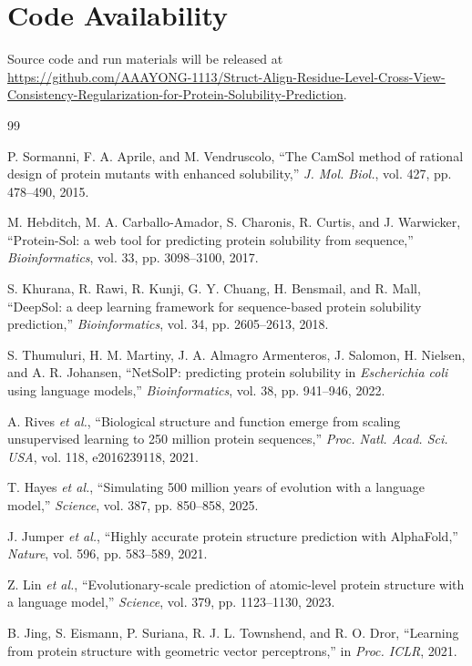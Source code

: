 \documentclass[conference]{IEEEtran}
\begin{document}
\section*{Code Availability}
Source code and run materials will be released at \url{https://github.com/AAAYONG-1113/Struct-Align-Residue-Level-Cross-View-Consistency-Regularization-for-Protein-Solubility-Prediction}.

\begin{thebibliography}{99}

P. Sormanni, F. A. Aprile, and M. Vendruscolo, ``The CamSol method of rational design of protein mutants with enhanced solubility,'' \emph{J. Mol. Biol.}, vol. 427, pp. 478--490, 2015.

M. Hebditch, M. A. Carballo-Amador, S. Charonis, R. Curtis, and J. Warwicker, ``Protein-Sol: a web tool for predicting protein solubility from sequence,'' \emph{Bioinformatics}, vol. 33, pp. 3098--3100, 2017.

S. Khurana, R. Rawi, R. Kunji, G. Y. Chuang, H. Bensmail, and R. Mall, ``DeepSol: a deep learning framework for sequence-based protein solubility prediction,'' \emph{Bioinformatics}, vol. 34, pp. 2605--2613, 2018.

S. Thumuluri, H. M. Martiny, J. A. Almagro Armenteros, J. Salomon, H. Nielsen, and A. R. Johansen, ``NetSolP: predicting protein solubility in \emph{Escherichia coli} using language models,'' \emph{Bioinformatics}, vol. 38, pp. 941--946, 2022.

A. Rives \emph{et al.}, ``Biological structure and function emerge from scaling unsupervised learning to 250 million protein sequences,'' \emph{Proc. Natl. Acad. Sci. USA}, vol. 118, e2016239118, 2021.

T. Hayes \emph{et al.}, ``Simulating 500 million years of evolution with a language model,'' \emph{Science}, vol. 387, pp. 850--858, 2025.

J. Jumper \emph{et al.}, ``Highly accurate protein structure prediction with AlphaFold,'' \emph{Nature}, vol. 596, pp. 583--589, 2021.

Z. Lin \emph{et al.}, ``Evolutionary-scale prediction of atomic-level protein structure with a language model,'' \emph{Science}, vol. 379, pp. 1123--1130, 2023.

B. Jing, S. Eismann, P. Suriana, R. J. L. Townshend, and R. O. Dror, ``Learning from protein structure with geometric vector perceptrons,'' in \emph{Proc. ICLR}, 2021.


\end{thebibliography}
\end{document}
